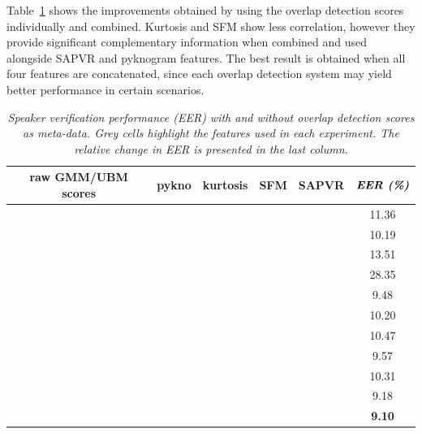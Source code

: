Table~\ref{tab:sid_stack_results} shows the improvements obtained by using the overlap detection scores individually and combined. 
Kurtosis and SFM show less correlation, however they provide significant complementary information when combined and used alongside SAPVR and pyknogram features. 
The best result is obtained when all four features are concatenated, since each overlap detection system may yield better performance in certain scenarios.  


\begin{table}[t]
	\centering
	\begin{tabular}{|c|c|c|c|c|c|}
		\hline
		raw GMM/UBM scores & pykno & kurtosis & SFM & SAPVR & $\textit{\textbf{EER (\%)}}$ \\ \hline
		\cellcolor[HTML]{C0C0C0}{\color[HTML]{343434} } \checkmark &  &  &  &  & 11.36\\ \hline \hline
		\cellcolor[HTML]{C0C0C0} \checkmark & \cellcolor[HTML]{C0C0C0} \checkmark &  &  &  & 10.19 \\ \hline
		\cellcolor[HTML]{C0C0C0} \checkmark &  & \cellcolor[HTML]{C0C0C0} \checkmark &  &  & 13.51 \\ \hline
		\cellcolor[HTML]{C0C0C0}{\color[HTML]{343434} } \checkmark &  &  & \cellcolor[HTML]{C0C0C0}{\color[HTML]{343434} } \checkmark &  & 28.35 \\ \hline
		\cellcolor[HTML]{C0C0C0} \checkmark &  &  &  & \cellcolor[HTML]{C0C0C0} \checkmark & 9.48 \\ \hline \hline
		\cellcolor[HTML]{C0C0C0}{\color[HTML]{343434} } \checkmark & \cellcolor[HTML]{C0C0C0} \checkmark & \cellcolor[HTML]{C0C0C0}{\color[HTML]{343434} } \checkmark &  &  & 10.20 \\ \hline
		\cellcolor[HTML]{C0C0C0} \checkmark & \cellcolor[HTML]{C0C0C0} \checkmark &  & \cellcolor[HTML]{C0C0C0} \checkmark &  & 10.47 \\ \hline
		\cellcolor[HTML]{C0C0C0} \checkmark & \cellcolor[HTML]{C0C0C0} \checkmark &  &  & \cellcolor[HTML]{C0C0C0} \checkmark & 9.57 \\ \hline \hline
		\cellcolor[HTML]{C0C0C0} \checkmark & \cellcolor[HTML]{C0C0C0} \checkmark & \cellcolor[HTML]{C0C0C0} \checkmark & \cellcolor[HTML]{C0C0C0} \checkmark &  & 10.31 \\ \hline
		\cellcolor[HTML]{C0C0C0} \checkmark & \cellcolor[HTML]{C0C0C0} \checkmark & \cellcolor[HTML]{C0C0C0} \checkmark & \cellcolor[HTML]{FFFFFF} & \cellcolor[HTML]{C0C0C0} \checkmark & 9.18 \\ \hline
		\cellcolor[HTML]{C0C0C0} \checkmark & \cellcolor[HTML]{C0C0C0} \checkmark & \cellcolor[HTML]{C0C0C0} \checkmark & \cellcolor[HTML]{C0C0C0} \checkmark & \cellcolor[HTML]{C0C0C0} \checkmark & {\bf 9.10}\\ \hline
	\end{tabular}
	\caption{\it Speaker verification performance (EER) with and without overlap detection scores as meta-data. Grey cells highlight the features used in each experiment. The relative change in EER is presented in the last column.}
	\label{tab:sid_stack_results}
	\vspace{-5mm}
\end{table}

